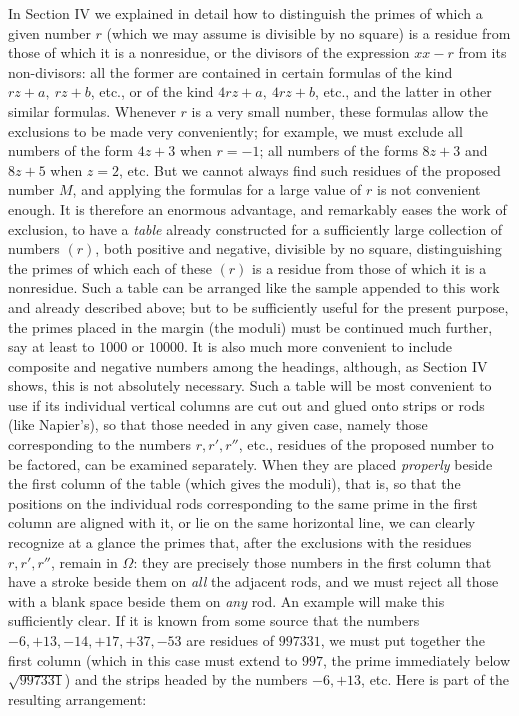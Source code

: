In Section IV we explained in detail how to distinguish the primes of which a given number \(r\) (which we may assume is divisible by no square) is a residue from those of which it is a nonresidue, or the divisors of the expression \(xx-r\) from its non-divisors: all the former are contained in certain formulas of the kind \(rz+a,\allowbreak \ rz+b\), etc., or of the kind \(4rz+a,\allowbreak \ 4rz+b\), etc., and the latter in other similar formulas. Whenever \(r\) is a very small number, these formulas allow the exclusions to be made
very conveniently; for example, we must exclude all numbers of the form \(4z+3\) when \(r=-1\); all numbers of the forms \(8z+3\) and \(8z+5\) when \(z=2\), etc. But we cannot always find such residues of the proposed number \(M\), and applying the formulas for a large value of \(r\) is not convenient enough. It is therefore an enormous advantage, and remarkably eases the work of exclusion, to have a \textit{table} already constructed for a sufficiently large collection of numbers \((r)\), both positive and negative, divisible by no square, distinguishing the primes of which each of these \((r)\) is a residue from those of which it is a nonresidue. Such a table can be arranged like the sample appended to this work and already described above; but to be sufficiently useful for the present purpose, the primes placed in the margin (the moduli) must be continued much further, say at least to \(1000\) or \(10000\). It is also much more convenient to include composite and negative numbers among the headings, although, as Section IV shows, this is not absolutely necessary. Such a table will be most convenient to use if its individual vertical columns are cut out and glued onto strips or rods (like Napier's), so that those needed in any given case, namely those corresponding to the numbers \(r,\allowbreak r',\allowbreak r''\), etc., residues of the proposed number to be factored, can be examined separately. When they are placed \textit{properly} beside the first column of the table (which gives the moduli), that is, so that the positions on the individual rods corresponding to the same prime in the first column are aligned with it, or lie on the same horizontal line, we can clearly recognize at a glance the primes that, after the exclusions with the residues \(r,\allowbreak r',\allowbreak r''\), remain in \(\Omega\): they are precisely those numbers in the first column that have a stroke beside them on \textit{all} the adjacent rods, and we must reject all those with a blank space beside them on \textit{any} rod. An example will make this sufficiently clear. If it is known from some source that the numbers \(-6,\allowbreak +13,\allowbreak -14,\allowbreak +17,\allowbreak +37,\allowbreak -53\) are residues of \(997331\), we must put together the first column (which in this case must extend to \(997\), the prime immediately below \(\surd{997331}\)) and the strips headed by the numbers \(-6,\allowbreak +13\), etc. Here is part of the resulting arrangement:
